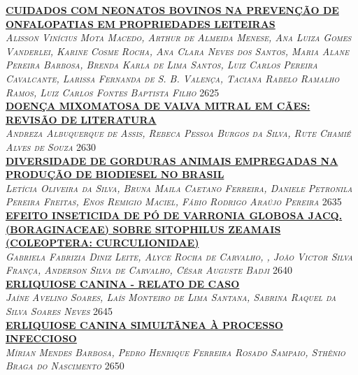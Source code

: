 \noindent \textsc{\hyperlink{trabalhos/251704.pdf.1}{\textbf{CUIDADOS COM NEONATOS BOVINOS NA PREVENÇÃO DE ONFALOPATIAS EM PROPRIEDADES LEITEIRAS}}}\\ 
\noindent \textsc{\textit{Alisson Vinícius Mota Macedo, Arthur de Almeida Menese, Ana Luiza Gomes Vanderlei, Karine Cosme Rocha, Ana Clara Neves dos Santos, Maria Alane Pereira Barbosa, Brenda Karla de Lima Santos, Luiz Carlos Pereira Cavalcante, Larissa Fernanda de S. B. Valença, Taciana Rabelo Ramalho Ramos, Luiz Carlos Fontes Baptista Filho}} \hfill 2625\\ 

\noindent \textsc{\hyperlink{trabalhos/250057.pdf.1}{\textbf{DOENÇA MIXOMATOSA DE VALVA MITRAL EM CÃES: REVISÃO DE LITERATURA}}}\\ 
\noindent \textsc{\textit{Andreza Albuquerque de Assis, Rebeca Pessoa Burgos da Silva, Rute Chamié Alves de Souza}} \hfill 2630\\ 

\noindent \textsc{\hyperlink{trabalhos/251607.pdf.1}{\textbf{DIVERSIDADE DE GORDURAS ANIMAIS EMPREGADAS NA PRODUÇÃO DE BIODIESEL NO BRASIL }}}\\ 
\noindent \textsc{\textit{Letícia Oliveira da Silva, Bruna Maila Caetano Ferreira, Daniele Petronila Pereira Freitas, Enos Remigio Maciel, Fábio Rodrigo Araújo Pereira}} \hfill 2635\\ 

\noindent \textsc{\hyperlink{trabalhos/250107.pdf.1}{\textbf{EFEITO INSETICIDA DE PÓ DE VARRONIA GLOBOSA JACQ. (BORAGINACEAE) SOBRE SITOPHILUS ZEAMAIS (COLEOPTERA: CURCULIONIDAE)}}}\\ 
\noindent \textsc{\textit{Gabriela Fabrizia Diniz Leite, Alyce Rocha de Carvalho, , João Victor Silva França, Anderson Silva de Carvalho, César Auguste Badji}} \hfill 2640\\ 

\noindent \textsc{\hyperlink{trabalhos/250416.pdf.1}{\textbf{ERLIQUIOSE CANINA - RELATO DE CASO}}}\\ 
\noindent \textsc{\textit{Jaíne Avelino Soares, Laís Monteiro de Lima Santana, Sabrina Raquel da Silva Soares Neves}} \hfill 2645\\ 

\noindent \textsc{\hyperlink{trabalhos/247783.pdf.1}{\textbf{ERLIQUIOSE CANINA SIMULTÃNEA À PROCESSO INFECCIOSO}}}\\ 
\noindent \textsc{\textit{Mírian Mendes Barbosa, Pedro Henrique Ferreira Rosado Sampaio, Sthênio Braga do Nascimento}} \hfill 2650\\ 

